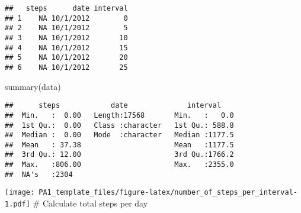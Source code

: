 \documentclass[
]{article}
\newenvironment{Shaded}{\begin{snugshade}}{\end{snugshade}}
\newcommand{\AttributeTok}[1]{\textcolor[rgb]{0.77,0.63,0.00}{#1}}
\newcommand{\ConstantTok}[1]{\textcolor[rgb]{0.00,0.00,0.00}{#1}}
\newcommand{\FunctionTok}[1]{\textcolor[rgb]{0.00,0.00,0.00}{#1}}
\newcommand{\NormalTok}[1]{#1}
\newcommand{\OtherTok}[1]{\textcolor[rgb]{0.56,0.35,0.01}{#1}}
\newcommand{\SpecialCharTok}[1]{\textcolor[rgb]{0.00,0.00,0.00}{#1}}
\newcommand{\StringTok}[1]{\textcolor[rgb]{0.31,0.60,0.02}{#1}}
\begin{document}
\begin{verbatim}
##   steps      date interval
## 1    NA 10/1/2012        0
## 2    NA 10/1/2012        5
## 3    NA 10/1/2012       10
## 4    NA 10/1/2012       15
## 5    NA 10/1/2012       20
## 6    NA 10/1/2012       25
\end{verbatim}

\begin{Shaded}
\begin{Highlighting}[]
\FunctionTok{summary}\NormalTok{(data)}
\end{Highlighting}
\end{Shaded}

\begin{verbatim}
##      steps            date              interval     
##  Min.   :  0.00   Length:17568       Min.   :   0.0  
##  1st Qu.:  0.00   Class :character   1st Qu.: 588.8  
##  Median :  0.00   Mode  :character   Median :1177.5  
##  Mean   : 37.38                      Mean   :1177.5  
##  3rd Qu.: 12.00                      3rd Qu.:1766.2  
##  Max.   :806.00                      Max.   :2355.0  
##  NA's   :2304
\end{verbatim}

\begin{Shaded}
\end{Shaded}

\texttt{[image: PA1\_template\_files/figure-latex/number\_of\_steps\_per\_interval-1.pdf]}
\# Calculate total steps per day

\begin{Shaded}
\end{Shaded}
\end{document}
